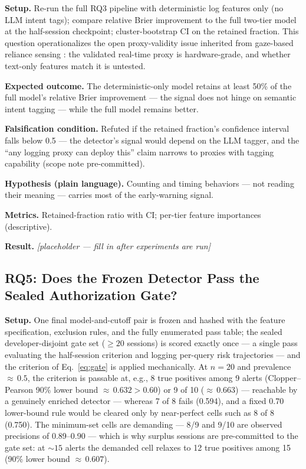 \documentclass[11pt]{article}
\begin{document}
\textbf{Setup.} Re-run the full RQ3 pipeline with deterministic log features only (no LLM intent tags); compare relative Brier improvement to the full two-tier model at the half-session checkpoint; cluster-bootstrap CI on the retained fraction. This question operationalizes the open proxy-validity issue inherited from gaze-based reliance sensing \citep{cao2022reliance}: the validated real-time proxy is hardware-grade, and whether text-only features match it is untested.

\textbf{Expected outcome.} The deterministic-only model retains at least 50\% of the full model's relative Brier improvement --- the signal does not hinge on semantic intent tagging --- while the full model remains better.

\textbf{Falsification condition.} Refuted if the retained fraction's confidence interval falls below 0.5 --- the detector's signal would depend on the LLM tagger, and the ``any logging proxy can deploy this'' claim narrows to proxies with tagging capability (scope note pre-committed).

\textbf{Hypothesis (plain language).} Counting and timing behaviors --- not reading their meaning --- carries most of the early-warning signal.

\textbf{Metrics.} Retained-fraction ratio with CI; per-tier feature importances (descriptive).

\textbf{Result.} \emph{[placeholder --- fill in after experiments are run]}

\subsection{RQ5: Does the Frozen Detector Pass the Sealed Authorization Gate?}

\textbf{Setup.} One final model-and-cutoff pair is frozen and hashed with the feature specification, exclusion rules, and the fully enumerated pass table; the sealed developer-disjoint gate set ($\geq 20$ sessions) is scored exactly once --- a single pass evaluating the half-session criterion and logging per-query risk trajectories --- and the criterion of Eq.~\eqref{eq:gate} is applied mechanically. At $n = 20$ and prevalence ${\approx}\,0.5$, the criterion is passable at, e.g., 8 true positives among 9 alerts (Clopper--Pearson 90\% lower bound ${\approx}\,0.632 > 0.60$) or 9 of 10 (${\approx}\,0.663$) --- reachable by a genuinely enriched detector --- whereas 7 of 8 fails (0.594), and a fixed 0.70 lower-bound rule would be cleared only by near-perfect cells such as 8 of 8 (0.750). The minimum-set cells are demanding --- 8/9 and 9/10 are observed precisions of 0.89--0.90 --- which is why surplus sessions are pre-committed to the gate set: at ${\sim}15$ alerts the demanded cell relaxes to 12 true positives among 15 (90\% lower bound ${\approx}\,0.607$).
\end{document}

